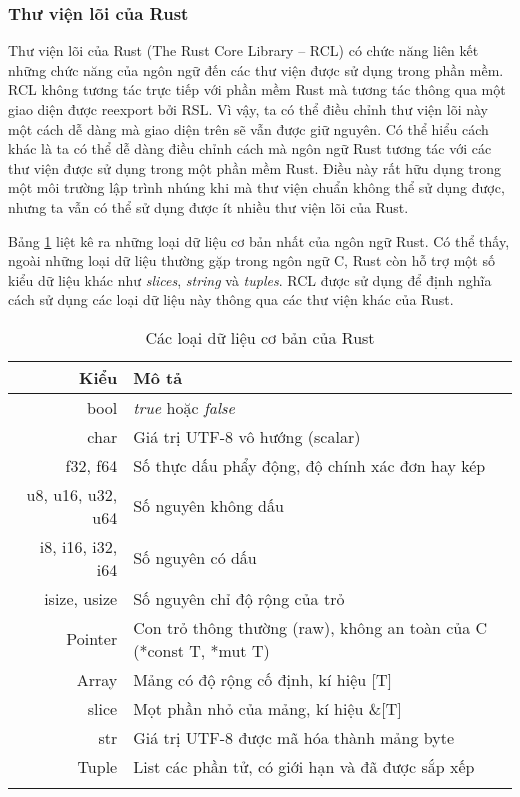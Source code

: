 \subsubsection{Thư viện lõi của Rust}
Thư viện lõi của Rust (The Rust Core Library -- RCL) có chức năng liên kết những chức năng của ngôn ngữ đến các thư viện được sử dụng trong phần mềm.
RCL không tương tác trực tiếp với phần mềm Rust mà tương tác thông qua một giao diện được reexport bởi RSL.
Vì vậy, ta có thể điều chỉnh thư viện lõi này một cách dễ dàng mà giao diện trên sẽ vẫn được giữ nguyên.
Có thể hiểu cách khác là ta có thể dễ dàng điều chỉnh cách mà ngôn ngữ Rust tương tác với các thư viện được sử dụng trong một phần mềm Rust.
Điều này rất hữu dụng trong một môi trường lập trình nhúng khi mà thư viện chuẩn không thể sử dụng được, nhưng ta vẫn có thể sử dụng được ít nhiều thư viện lõi của Rust.

Bảng \ref{tbl:rust_primitive_type} liệt kê ra những loại dữ liệu cơ bản nhất của ngôn ngữ Rust.
Có thể thấy, ngoài những loại dữ liệu thường gặp trong ngôn ngữ C, Rust còn hỗ trợ một số kiểu dữ liệu khác như \emph{slices}, \emph{string} và \emph{tuples}.
RCL được sử dụng để định nghĩa cách sử dụng các loại dữ liệu này thông qua các thư viện khác của Rust.

\begin{longtable}{r|l}
\textbf{Kiểu} & \textbf{Mô tả} \\
\midrule
\endhead
bool & \emph{true} hoặc \emph{false} \\
char & Giá trị UTF-8 vô hướng (scalar) \\
f32, f64 & Số thực dấu phẩy động, độ chính xác đơn hay kép \\
u8, u16, u32, u64 & Số nguyên không dấu \\
i8, i16, i32, i64 & Số nguyên có dấu \\
isize, usize & Số nguyên chỉ độ rộng của trỏ \\
Pointer & Con trỏ thông thường (raw), không an toàn của C (*const T, *mut T) \\
Array & Mảng có độ rộng cố định, kí hiệu [T] \\
slice & Mọt phần nhỏ của mảng, kí hiệu \&[T] \\
str & Giá trị UTF-8 được mã hóa thành mảng byte \\
Tuple & List các phần tử, có giới hạn và đã được sắp xếp \\
\bottomrule
\caption{Các loại dữ liệu cơ bản của Rust}
\label{tbl:rust_primitive_type}
\end{longtable}
